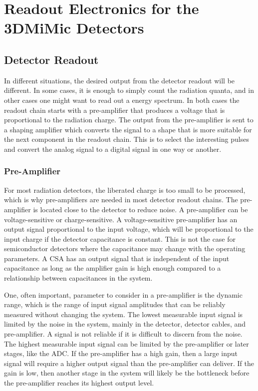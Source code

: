 \documentclass[../main/thesis.tex]{subfiles}
\begin{document}
\newchapter

\chapter{Readout Electronics for the 3DMiMic Detectors}
\label{e}
 

\section{Detector Readout}
\label{t-read}
In different situations, the desired output from the detector readout will be different. In some cases, it is enough to simply count the radiation quanta, and in other cases one might want to read out a energy spectrum. In both cases the readout chain starts with a pre-amplifier that produces a voltage that is proportional to the radiation charge. The output from the pre-amplifier is sent to a shaping amplifier which converts the signal to a shape that is more suitable for the next component in the readout chain. This is to select the interesting pulses and convert the analog signal to a digital signal in one way or another. \citep[chap. 16]{Knoll}

\subsection{Pre-Amplifier}
\label{t-amp}
For most radiation detectors, the liberated charge is too small to be processed, which is why pre-amplifiers are needed in most detector readout chains. The pre-amplifier is located close to the detector to reduce noise. A pre-amplifier can be voltage-sensitive or charge-sensitive. A voltage-sensitive pre-amplifier has an output signal proportional to the input voltage, which will be proportional to the input charge if the detector capacitance is constant. This is not the case for semiconductor detectors where the capacitance may change with the operating parameters. A \gls{CSA} has an output signal that is independent of the input capacitance as long as the amplifier gain is high enough compared to a relationship between capacitances in the system. \citep[chap. 16]{Knoll}

One, often important, parameter to consider in a pre-amplifier is the dynamic range, which is the range of input signal amplitudes that can be reliably measured without changing the system. The lowest measurable input signal is limited by the noise in the system, mainly in the detector, detector cables, and pre-amplifier. A signal is not reliable if it is difficult to discern from the noise. The highest measurable input signal can be limited by the pre-amplifier or later stages, like the \gls{ADC}. If the pre-amplifier has a high gain, then a large input signal will require a higher output signal than the pre-amplifier can deliver. If the gain is low, then another stage in the system will likely be the bottleneck before the pre-amplifier reaches its highest output level. \citep{dynamic-range}
\end{document}

